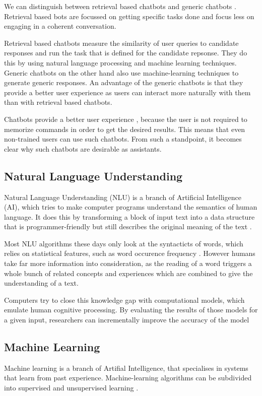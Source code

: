 We can distinguish between retrieval based chatbots and generic chatbots \cite{NLKl19,WWX*16}. Retrieval based bots are focussed on getting specific tasks done and focus less on engaging in a coherent conversation.

Retrieval based chatbots measure the similarity of user queries to candidate responses and run the task that is defined for the candidate repsonse. They do this by using natural language processing and machine learning techniques. Generic chatbots on the other hand also use machine-learning techniques to generate generic responses. An advantage of the generic chatbots is that they provide a better user experience as users can interact more naturally with them than with retrieval based chatbots.

Chatbots provide a better user experience \cite{CHW*17}, because the user is not required to memorize commands in order to get the desired results. This means that even non-trained users can use such chatbots. From such a standpoint, it becomes clear why such chatbots are desirable as assistants.

\subsection{Natural Language Understanding}
Natural Language Understanding (NLU) is a branch of Artificial Intelligence (AI), which tries to make computer programs understand the semantics of human language. It does this by transforming a block of input text into a data structure that is programmer-friendly but still describes the original meaning of the text \cite{CWB*11}.

Most NLU algorithms these days only look at the syntacticts of words, which relies on statistical features, such as word occurence frequency \cite{CaWh14}. However humans take far more information into consideration, as the reading of a word triggers a whole bunch of related concepts and experiences which are combined to give the understanding of a text.

Computers try to close this knowledge gap with computational models, which emulate human cognitive processing. By evaluating the results of those models for a given input, researchers can incrementally improve the accuracy of the model \cite{CaWh14}

\subsection{Machine Learning}
Machine learning is a branch of Artifial Intelligence, that specialises in systems that learn from past experience. Machine-learning algorithms can be subdivided into supervised and unsupervised learning \cite{MiBu16}.


